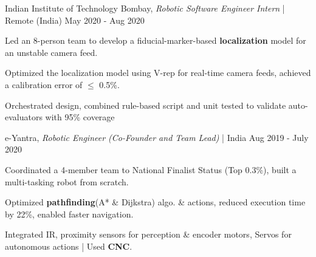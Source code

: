 \begin{cventries2}
  \cventrynew
    {Indian Institute of Technology Bombay, \textnormal{\textit{Robotic Software Engineer Intern} | Remote (India)}} %
    {May 2020 - Aug 2020} %
    {
      \begin{cvitems} %
        \item {Led an 8-person team to develop a fiducial-marker-based {\bf localization} model for an unstable camera feed.}
        \item {Optimized the localization model using V-rep for real-time camera feeds, achieved a calibration error of $\leq$  0.5\%.}
        \item {Orchestrated design, combined rule-based script and unit tested to validate auto-evaluators with 95\% coverage}
      \end{cvitems}
    }
  \cventrynew
    { e-Yantra, \textnormal{\textit{Robotic Engineer (Co-Founder and Team Lead)} | India  }} %
    {Aug 2019 - July 2020} %
    {
      \begin{cvitems} %
        \item {Coordinated a 4-member team to National Finalist Status (Top 0.3\%), built a multi-tasking robot from scratch.} 
        \item {Optimized {\bf pathfinding}(A* \& Dijkstra) algo. \& actions, reduced execution time by 22\%, enabled faster navigation.}
        \item {Integrated IR, proximity sensors for perception \& encoder motors, Servos for autonomous actions | Used {\bf CNC}.}
      \end{cvitems}
    }


\end{cventries2}
